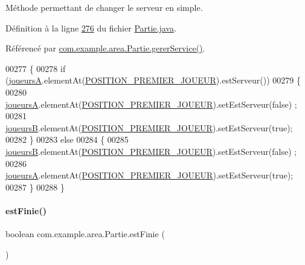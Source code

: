 Méthode permettant de changer le serveur en simple. 



Définition à la ligne \hyperlink{_partie_8java_source_l00276}{276} du fichier \hyperlink{_partie_8java_source}{Partie.\+java}.



Référencé par \hyperlink{_partie_8java_source_l00220}{com.\+example.\+area.\+Partie.\+gerer\+Service()}.


\begin{DoxyCode}
00277     \{
00278         \textcolor{keywordflow}{if} (\hyperlink{classcom_1_1example_1_1area_1_1_partie_a190a033a96ec435589ac53f78d60890b}{joueursA}.elementAt(\hyperlink{classcom_1_1example_1_1area_1_1_partie_a2f977d38424ff199a053d9e3cd4eb8c6}{POSITION\_PREMIER\_JOUEUR}).estServeur())
00279         \{
00280             \hyperlink{classcom_1_1example_1_1area_1_1_partie_a190a033a96ec435589ac53f78d60890b}{joueursA}.elementAt(\hyperlink{classcom_1_1example_1_1area_1_1_partie_a2f977d38424ff199a053d9e3cd4eb8c6}{POSITION\_PREMIER\_JOUEUR}).setEstServeur(\textcolor{keyword}{false})
      ;
00281             \hyperlink{classcom_1_1example_1_1area_1_1_partie_a208910b83df461c3a2503f3b28650ce8}{joueursB}.elementAt(\hyperlink{classcom_1_1example_1_1area_1_1_partie_a2f977d38424ff199a053d9e3cd4eb8c6}{POSITION\_PREMIER\_JOUEUR}).setEstServeur(\textcolor{keyword}{true});
00282         \}
00283         \textcolor{keywordflow}{else}
00284         \{
00285             \hyperlink{classcom_1_1example_1_1area_1_1_partie_a208910b83df461c3a2503f3b28650ce8}{joueursB}.elementAt(\hyperlink{classcom_1_1example_1_1area_1_1_partie_a2f977d38424ff199a053d9e3cd4eb8c6}{POSITION\_PREMIER\_JOUEUR}).setEstServeur(\textcolor{keyword}{false})
      ;
00286             \hyperlink{classcom_1_1example_1_1area_1_1_partie_a190a033a96ec435589ac53f78d60890b}{joueursA}.elementAt(\hyperlink{classcom_1_1example_1_1area_1_1_partie_a2f977d38424ff199a053d9e3cd4eb8c6}{POSITION\_PREMIER\_JOUEUR}).setEstServeur(\textcolor{keyword}{true});
00287         \}
00288     \}
\end{DoxyCode}
\mbox{\label{classcom_1_1example_1_1area_1_1_partie_ab0dd955a65440cab1569311ff35de3eb}} 
\paragraph{\texorpdfstring{est\+Finie()}{estFinie()}}
{\footnotesize\ttfamily boolean com.\+example.\+area.\+Partie.\+est\+Finie (\begin{DoxyParamCaption}{ }\end{DoxyParamCaption})}



